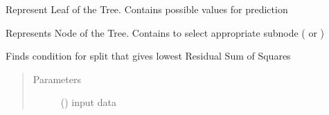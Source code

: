 \documentclass[letterpaper,10pt,english]{sphinxmanual}
\begin{document}

\begin{fulllineitems}
\label{\detokenize{tree:random_forest.tree.Leaf}}
Represent Leaf of the Tree. Contains possible values for prediction

\end{fulllineitems}


\begin{fulllineitems}
\label{\detokenize{tree:random_forest.tree.Node}}
Represents Node of the Tree. Contains {\hyperref[\detokenize{tree:random_forest.tree.Condition}]{}} to select appropriate subnode ({\hyperref[\detokenize{tree:random_forest.tree.Node}]{}} or {\hyperref[\detokenize{tree:random_forest.tree.Leaf}]{}})

\begin{fulllineitems}
\label{\detokenize{tree:random_forest.tree.Node.find_best_split}}
Finds condition for split that gives lowest Residual Sum of Squares
\begin{quote}\begin{description}
\item[{Parameters}] \leavevmode
{} () \textendash{} input data

\end{description}\end{quote}

\end{fulllineitems}


\end{fulllineitems}
\end{document}
